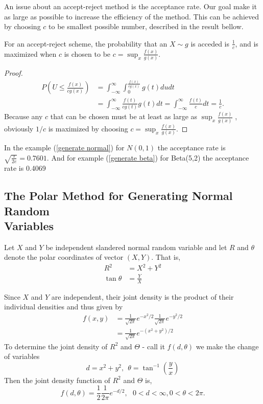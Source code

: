An issue about an accept-reject method is the acceptance rate.
Our goal make it as large as possible to increase the efficiency of the method.
This can be achieved by choosing $c$ to be smallest possible number, described in the result bellow.
\begin{theorem}
	For an accept-reject scheme, the probability that an $X\sim g$ is acceded is  $\frac{1}{c}$,
	and is maximized when $c$ is chosen to be $c=\sup_x\frac{f(x)}{g(x)}.$
\end{theorem}
\begin{proof}
	\begin{align*}
		P\left( U \le \frac{f(x)}{cg(x)} \right) & = \int_{-\infty}^{\infty} \int_{0}^{\frac{f(x)}{cg(x)}} g(t) du dt                                           \\
		                                      & = \int_{-\infty}^{\infty} \frac{f(t)}{cg(t)}g(t)dt = \int_{-\infty}^{\infty} \frac{f(t)}{c}dt = \frac{1}{c}.
	\end{align*}
	Because any $c$ that can be chosen must be at least as large as $\sup_x\frac{f(x)}{g(x)}$
	, obviously $1/c$ is maximized by choosing $c=\sup_x\frac{f(x)}{g(x)}.$
\end{proof}

In the example (\ref{generate normal}) for $N(0,1)$ the acceptance rate is $\sqrt{\frac{\pi}{2 e}} = 0.7601$.
And for example (\ref{generate beta}) for Beta(5,2) the acceptance rate is 0.4069

\subsection{The Polar Method for Generating Normal Random \\ Variables}

Let $X$ and $Y$ be independent slandered normal random variable and let $R$ and $\theta$
denote the polar coordinates of vector $(X,Y)$. That is,
\begin{align*}
	R^{2}       & = X^{2} + Y^2 \\
	\tan \theta & = \frac{Y}{X}
\end{align*}

Since $X$ and $Y$ are independent, their joint density is the product of their individual densities and thus given by
\begin{align*}
	f(x,y) & = \frac{1}{\sqrt{2\pi}} e^{-x^{2}/2 } \frac{1}{\sqrt{2\pi}} e^{-y^{2}/2 } \\
	       & = \frac{1}{\sqrt{2\pi}} e^{-(x^{2}+y^{2})/2}
\end{align*}
To determine the joint density of $R^{2} $ and $\Theta$ - call it $f(d,\theta)$ we make the change of variables
\[
	d=x^{2}+y^{2}, \ \  \theta=\tan^{-1}\left( \frac{y}{x} \right)
\]
Then the joint density function of $R^{2} $ and $\Theta$ is,
\begin{equation}
	f(d,\theta) = \frac{1}{2}\frac{1}{2\pi} e^{-d/2},\ \ \ 0< d<\infty, 0<\theta<2 \pi.
\end{equation}

